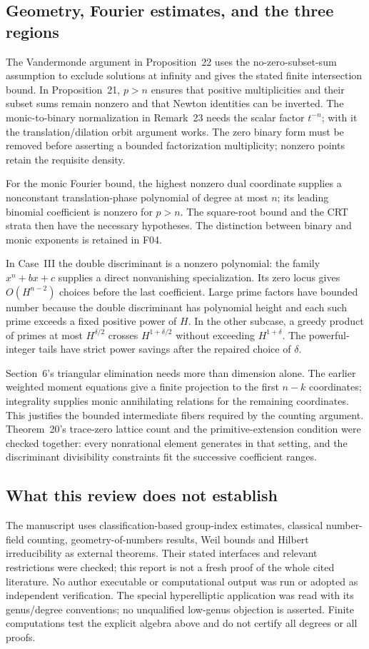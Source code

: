 \documentclass[10pt]{article}
\begin{document}
\subsection*{Geometry, Fourier estimates, and the three regions}
The Vandermonde argument in Proposition 22 uses the no-zero-subset-sum assumption to exclude solutions at infinity and gives the stated finite intersection bound. In Proposition 21, \(p>n\) ensures that positive multiplicities and their subset sums remain nonzero and that Newton identities can be inverted. The monic-to-binary normalization in Remark 23 needs the scalar factor \(t^{-n}\); with it the translation/dilation orbit argument works. The zero binary form must be removed before asserting a bounded factorization multiplicity; nonzero points retain the requisite density.\par
For the monic Fourier bound, the highest nonzero dual coordinate supplies a nonconstant translation-phase polynomial of degree at most \(n\); its leading binomial coefficient is nonzero for \(p>n\). The square-root bound and the CRT strata then have the necessary hypotheses. The distinction between binary and monic exponents is retained in F04.\par
In Case III the double discriminant is a nonzero polynomial: the family \(x^n+bx+c\) supplies a direct nonvanishing specialization. Its zero locus gives \(O(H^{n-2})\) choices before the last coefficient. Large prime factors have bounded number because the double discriminant has polynomial height and each such prime exceeds a fixed positive power of \(H\). In the other subcase, a greedy product of primes at most \(H^{\delta/2}\) crosses \(H^{1+\delta/2}\) without exceeding \(H^{1+\delta}\). The powerful-integer tails have strict power savings after the repaired choice of \(\delta\).\par
Section 6’s triangular elimination needs more than dimension alone. The earlier weighted moment equations give a finite projection to the first \(n-k\) coordinates; integrality supplies monic annihilating relations for the remaining coordinates. This justifies the bounded intermediate fibers required by the counting argument. Theorem 20’s trace-zero lattice count and the primitive-extension condition were checked together: every nonrational element generates in that setting, and the discriminant divisibility constraints fit the successive coefficient ranges.\par
\subsection*{What this review does not establish}
The manuscript uses classification-based group-index estimates, classical number-field counting, geometry-of-numbers results, Weil bounds and Hilbert irreducibility as external theorems. Their stated interfaces and relevant restrictions were checked; this report is not a fresh proof of the whole cited literature. No author executable or computational output was run or adopted as independent verification. The special hyperelliptic application was read with its genus/degree conventions; no unqualified low-genus objection is asserted. Finite computations test the explicit algebra above and do not certify all degrees or all proofs.\par
\end{document}
